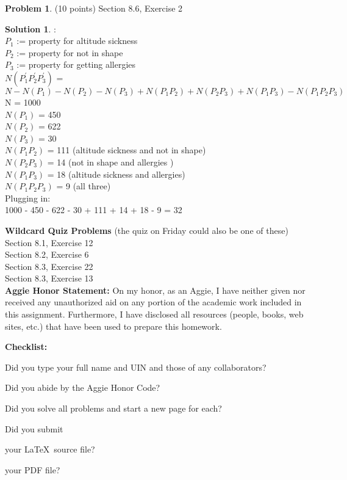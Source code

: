 \documentclass{article}
\theoremstyle{definition}
\newtheorem{problem}{Problem}
\newtheorem*{solution}{Solution}
\newcommand{\honor}{\noindent \textbf{Aggie Honor Statement: }On my honor, as an Aggie, I have neither
  given nor received any unauthorized aid on any portion of the
  academic work included in this assignment. Furthermore, I have
  disclosed all resources (people, books, web sites, etc.) that have
  been used to prepare this homework. 
}
\newcommand{\checklist}{\noindent\textbf{Checklist:}
\begin{compactenum}
\item Did you type your full name and UIN and those of any collaborators? 
\item Did you abide by the Aggie Honor Code?
\item Did you solve all problems and start a new page for each? 
\item Did you submit
\begin{compactenum}
\item your \LaTeX\ source file?
\item your  PDF file?
\end{compactenum}
\end{compactenum}
}
\begin{document}
\begin{problem} (10 points) Section 8.6, Exercise 2
\end{problem}
\begin{solution}:
\\
$P_1$ := property for altitude sickness \\
$P_2$ := property for not in shape \\
$P_3$ := property for getting allergies \\

$N(P_1^{'}P_2^{'}P_3^{'})$ = $N - N(P_1) - N(P_2) - N(P_3) + N(P_1P_2) + N(P_2P_3) + N(P_1P_3) - N(P_1P_2P_3)$
\\

N = 1000 \\
$N(P_1)$ = 450\\
$N(P_2)$ = 622\\
$N(P_3)$ = 30 \\
$N(P_1P_2)$ = 111 (altitude sickness and not in shape)\\
$N(P_2P_3)$ = 14 (not in shape and allergies )\\
$N(P_1P_3)$ = 18 (altitude sickness and allergies)\\
$N(P_1P_2P_3)$ = 9 (all three)\\

Plugging in:
\\
1000 - 450 - 622 - 30 + 111 + 14 + 18 - 9 = 32
\end{solution}



\goodbreak
\noindent
\textbf{Wildcard Quiz Problems} (the quiz on Friday could also be one of these)\\
Section 8.1, Exercise 12\\
Section 8.2, Exercise 6\\
Section 8.3, Exercise 22\\
Section 8.3, Exercise 13\\



\goodbreak
\honor

\bigskip
\checklist
\end{document}
